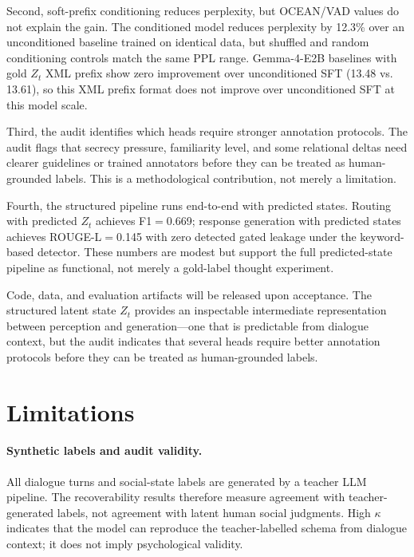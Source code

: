 \documentclass[11pt]{article}
\begin{document}
Second, soft-prefix conditioning reduces perplexity, but OCEAN/VAD values do not explain the gain.
The conditioned model reduces perplexity by 12.3\% over an unconditioned baseline trained on identical data, but shuffled and random conditioning controls match the same PPL range.
Gemma-4-E2B baselines with gold $Z_t$ XML prefix show zero improvement over unconditioned SFT (13.48 vs. 13.61), so this XML prefix format does not improve over unconditioned SFT at this model scale.

Third, the audit identifies which heads require stronger annotation protocols.
The audit flags that secrecy pressure, familiarity level, and some relational deltas need clearer guidelines or trained annotators before they can be treated as human-grounded labels.
This is a methodological contribution, not merely a limitation.

Fourth, the structured pipeline runs end-to-end with predicted states.
Routing with predicted $Z_t$ achieves F1$=$0.669; response generation with predicted states achieves ROUGE-L$=$0.145 with zero detected gated leakage under the keyword-based detector.
These numbers are modest but support the full predicted-state pipeline as functional, not merely a gold-label thought experiment.

Code, data, and evaluation artifacts will be released upon acceptance.
The structured latent state $Z_t$ provides an inspectable intermediate representation between perception and generation---one that is predictable from dialogue context, but the audit indicates that several heads require better annotation protocols before they can be treated as human-grounded labels.

\section*{Limitations}
\label{sec:limitations}

\paragraph{Synthetic labels and audit validity.}
All dialogue turns and social-state labels are generated by a teacher LLM pipeline.
The recoverability results therefore measure agreement with teacher-generated labels, not agreement with latent human social judgments.
High $\kappa$ indicates that the model can reproduce the teacher-labelled schema from dialogue context; it does not imply psychological validity.
\end{document}

